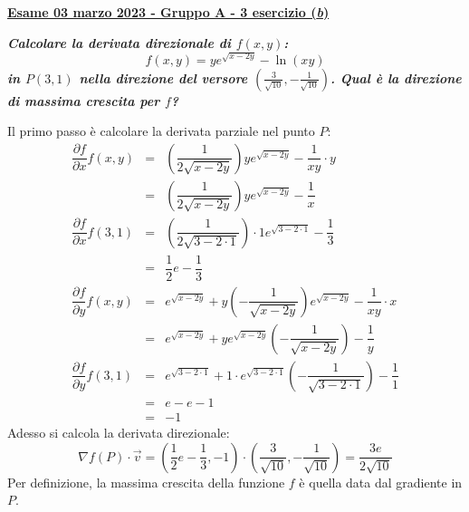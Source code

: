 \documentclass[a4paper]{article}
\newcommand{\definition}[1]{\textcolor{Red3}{\textbf{#1}}}
\newcommand{\example}[1]{\textcolor{Green4}{\textbf{#1}}}
\begin{document}
	\begin{flushleft}
		\label{exam: esame 03 marzo 2023 - Gruppo A - 3 esercizio (b)}
		\hypertarget{
			exam: esame 03 marzo 2023 - Gruppo A - 3 esercizio (b)
		}{
			\definition{\underline{Esame 03 marzo 2023 - Gruppo A - 3 esercizio (\emph{b})}}
		}
	\end{flushleft}
	\example{\emph{Calcolare la derivata direzionale di $f\left(x,y\right)$:}
	\begin{equation*}
		f\left(x,y\right) = y e^{\sqrt{x-2y}}-\ln\left(xy\right)
	\end{equation*}
	\emph{in $P\left(3,1\right)$ nella direzione del versore $\left(\frac{3}{\sqrt{10}}, -\frac{1}{\sqrt{10}}\right)$. Qual è la direzione di massima crescita per $f$?}}\newline

	\noindent
	Il primo passo è calcolare la derivata parziale nel punto $P$:
	\begin{equation*}
		\begin{array}{rcl}
			\dfrac{\partial f}{\partial x}f\left(x,y\right) &=& \left(\dfrac{1}{2\sqrt{x-2y}}\right)y e^{\sqrt{x-2y}}-\dfrac{1}{xy} \cdot y \\ [1em]
			&=& \left(\dfrac{1}{2\sqrt{x-2y}}\right)y e^{\sqrt{x-2y}}-\dfrac{1}{x} \\ [1em]
			\dfrac{\partial f}{\partial x}f\left(3,1\right) &=& \left(\dfrac{1}{2\sqrt{3-2 \cdot 1}}\right) \cdot 1 e^{\sqrt{3-2 \cdot 1}}-\dfrac{1}{3} \\ [1em]
			&=& \dfrac{1}{2} e - \dfrac{1}{3} \\ [2em]
			\dfrac{\partial f}{\partial y}f\left(x,y\right) &=& e^{\sqrt{x-2y}}+y\left(-\dfrac{1}{\sqrt{x-2y}}\right)e^{\sqrt{x-2y}} - \dfrac{1}{xy} \cdot x \\ [1em]
			&=& e^{\sqrt{x-2y}} + ye^{\sqrt{x-2y}} \left(-\dfrac{1}{\sqrt{x-2y}}\right) - \dfrac{1}{y} \\ [1em]
			\dfrac{\partial f}{\partial y}f\left(3,1\right) &=& e^{\sqrt{3-2 \cdot 1}} + 1 \cdot e^{\sqrt{3-2 \cdot 1}} \left(-\dfrac{1}{\sqrt{3-2 \cdot 1}}\right) - \dfrac{1}{1} \\ [1em]
			&=& e - e - 1 \\ [.5em]
			&=& -1
		\end{array}
	\end{equation*}
	Adesso si calcola la derivata direzionale:
	\begin{equation*}
		\nabla f\left(P\right) \cdot \overrightarrow{v} = \left(\dfrac{1}{2} e - \dfrac{1}{3}, -1\right) \cdot \left(\frac{3}{\sqrt{10}}, -\frac{1}{\sqrt{10}}\right) = \dfrac{3e}{2\sqrt{10}}
	\end{equation*}
	Per definizione, la massima crescita della funzione $f$ è quella data dal gradiente in $P$.
	
\end{document}
